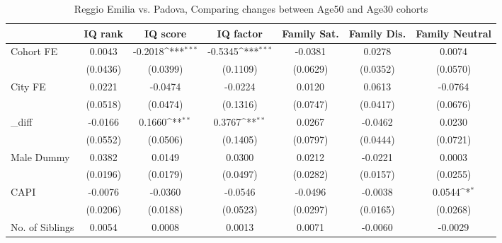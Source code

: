\begin{table}[htbp]\centering
\def\sym#1{\ifmmode^{#1}\else\(^{#1}\)\fi}
\caption{Reggio Emilia vs. Padova, Comparing changes between Age50 and Age30 cohorts}
\begin{tabular}{l*{6}{c}}
\toprule
            &\multicolumn{1}{c}{IQ rank}&\multicolumn{1}{c}{IQ score}&\multicolumn{1}{c}{IQ factor}&\multicolumn{1}{c}{Family Sat.}&\multicolumn{1}{c}{Family Dis.}&\multicolumn{1}{c}{Family Neutral}\\
\midrule
Cohort FE   &      0.0043         &     -0.2018\sym{***}&     -0.5345\sym{***}&     -0.0381         &      0.0278         &      0.0074         \\
            &    (0.0436)         &    (0.0399)         &    (0.1109)         &    (0.0629)         &    (0.0352)         &    (0.0570)         \\
\addlinespace
City FE     &      0.0221         &     -0.0474         &     -0.0224         &      0.0120         &      0.0613         &     -0.0764         \\
            &    (0.0518)         &    (0.0474)         &    (0.1316)         &    (0.0747)         &    (0.0417)         &    (0.0676)         \\
\addlinespace
\_diff       &     -0.0166         &      0.1660\sym{**} &      0.3767\sym{**} &      0.0267         &     -0.0462         &      0.0230         \\
            &    (0.0552)         &    (0.0506)         &    (0.1405)         &    (0.0797)         &    (0.0444)         &    (0.0721)         \\
\addlinespace
Male Dummy  &      0.0382         &      0.0149         &      0.0300         &      0.0212         &     -0.0221         &      0.0003         \\
            &    (0.0196)         &    (0.0179)         &    (0.0497)         &    (0.0282)         &    (0.0157)         &    (0.0255)         \\
\addlinespace
CAPI        &     -0.0076         &     -0.0360         &     -0.0546         &     -0.0496         &     -0.0038         &      0.0544\sym{*}  \\
            &    (0.0206)         &    (0.0188)         &    (0.0523)         &    (0.0297)         &    (0.0165)         &    (0.0268)         \\
\addlinespace
No. of Siblings&      0.0054         &      0.0008         &      0.0013         &      0.0071         &     -0.0060         &     -0.0029         \\

\end{tabular}
\end{table}
